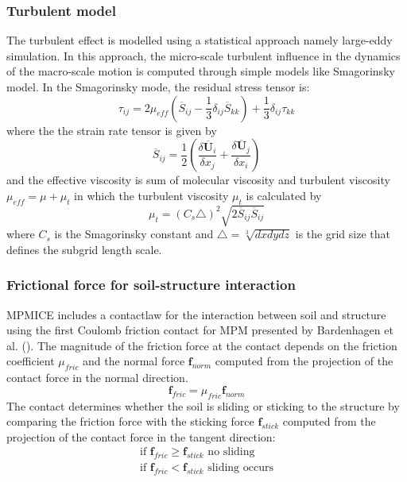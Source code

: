 \documentclass[preprint,12pt]{elsarticle}
\begin{document}
\subsubsection{Turbulent model}
The turbulent effect is modelled using a statistical approach namely large-eddy simulation. In this approach, the micro-scale turbulent influence in the dynamics of the macro-scale motion is computed through simple models like Smagorinsky model. In the Smagorinsky mode, the residual stress tensor is:
%
\begin{equation}
     \tau_{ij} = 2 \mu_{eff} (\overline{S}_{ij} - \frac{1}{3} \delta_{ij} \overline{S}_{kk}) + \frac{1}{3} \delta_{ij} \tau_{kk}
\end {equation}
%
%
where the the strain rate tensor is given by
%
\begin{equation}
     \overline{S}_{ij} = \frac{1}{2} (\frac{\delta \overline{\pmb{U}}_i}{\delta x_j} + \frac{\delta \overline{\pmb{U}}_j}{\delta x_i})
\end {equation}
%
%
and the effective viscosity is sum of molecular viscosity and turbulent viscosity $\mu_{eff} = \mu + \mu_t$ in which the turbulent viscosity $\mu_t$ is calculated by
%
\begin{equation}
    \mu_t = (C_s \triangle)^2 \sqrt{2 \overline{S}_{ij} \overline{S}_{ij}}
\end {equation}
%
%
where $C_s$ is the Smagorinsky constant and $\triangle = \sqrt[3]{dx dy dz}$ is the grid size that defines the subgrid length scale.
\subsubsection{Frictional force for soil-structure interaction}
MPMICE includes a contactlaw for the interaction between soil and structure using the first Coulomb friction contact for MPM presented by Bardenhagen et al. (\cite{MPMcontact}).  The magnitude of the friction force at the contact depends on the friction coefficient $\mu_{fric}$ and the normal force  $ \pmb{f}_{norm}$  computed from the projection of the contact force  in the normal direction.
%
\begin{equation}
   \pmb{f}_{fric} = \mu_{fric}  \pmb{f}_{norm}
\end {equation}
%
%
The contact determines whether the soil is sliding or sticking to the structure by comparing the friction force with the sticking force $\pmb{f}_{stick}$  computed from the projection of the contact force in the tangent direction:
%
\begin{equation}
\begin{gathered}
\textrm{   if    }    \pmb{f}_{fric} \geq  \pmb{f}_{stick}   \textrm{    no sliding    } \\
\textrm{    if    }   \pmb{f}_{fric} <   \pmb{f}_{stick}   \textrm{    sliding occurs    }  
\end {gathered}
\end {equation}
\end{document}
